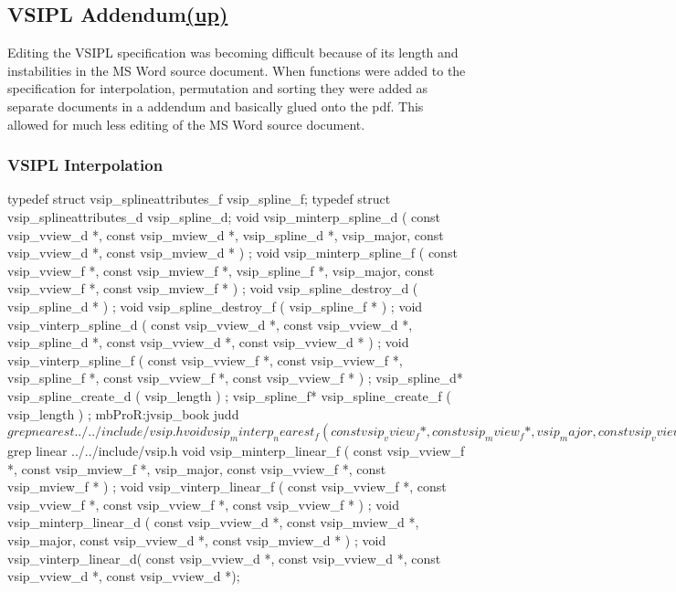 \subsection*{VSIPL Addendum\hspace*{\fill}\hyperlink{VSIPspecHead}{(up)}\hypertarget{Addendum}{}}
Editing the VSIPL specification was becoming difficult because of its length and instabilities in the MS Word source document. When functions were added to the specification for interpolation, permutation and sorting they were added as separate documents in a addendum and basically glued onto the pdf. This allowed for much less editing of the MS Word source document.
\subsubsection*{VSIPL Interpolation}
typedef struct vsip_splineattributes_f vsip_spline_f;
typedef struct vsip_splineattributes_d vsip_spline_d; 
void vsip_minterp_spline_d ( const vsip_vview_d *, const vsip_mview_d *, vsip_spline_d *, vsip_major, const vsip_vview_d *, const vsip_mview_d * ) ;
void vsip_minterp_spline_f ( const vsip_vview_f *, const vsip_mview_f *, vsip_spline_f *, vsip_major, const vsip_vview_f *, const vsip_mview_f * ) ;
void vsip_spline_destroy_d ( vsip_spline_d * ) ;
void vsip_spline_destroy_f ( vsip_spline_f * ) ;
void vsip_vinterp_spline_d ( const vsip_vview_d *, const vsip_vview_d *, vsip_spline_d *, const vsip_vview_d *, const vsip_vview_d * ) ;
void vsip_vinterp_spline_f ( const vsip_vview_f *, const vsip_vview_f *, vsip_spline_f *, const vsip_vview_f *, const vsip_vview_f * ) ;
vsip_spline_d* vsip_spline_create_d ( vsip_length ) ;
vsip_spline_f* vsip_spline_create_f ( vsip_length ) ;
mbProR:jvsip_book judd$ grep nearest ../../include/vsip.h
void vsip_minterp_nearest_f ( const vsip_vview_f *, const vsip_mview_f *, vsip_major, const vsip_vview_f *, const vsip_mview_f * ) ;
void vsip_vinterp_nearest_f ( const vsip_vview_f *, const vsip_vview_f *, const vsip_vview_f *, const vsip_vview_f * ) ;
void vsip_vinterp_nearest_d( const vsip_vview_d *, const vsip_vview_d *, const vsip_vview_d *, const vsip_vview_d *);
void vsip_minterp_nearest_d ( const vsip_vview_d*, const vsip_mview_d*, vsip_major, const vsip_vview_d*, const vsip_mview_d* ) ;
mbProR:jvsip_book judd$ grep linear ../../include/vsip.h
void vsip_minterp_linear_f ( const vsip_vview_f *, const vsip_mview_f *, vsip_major, const vsip_vview_f *, const vsip_mview_f * ) ;
void vsip_vinterp_linear_f ( const vsip_vview_f *, const vsip_vview_f *, const vsip_vview_f *, const vsip_vview_f * ) ;
void vsip_minterp_linear_d ( const vsip_vview_d *, const vsip_mview_d *, vsip_major, const vsip_vview_d *, const vsip_mview_d * ) ;
void vsip_vinterp_linear_d( const vsip_vview_d *, const vsip_vview_d *, const vsip_vview_d *, const vsip_vview_d *);

